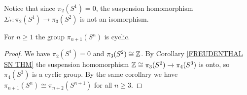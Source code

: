 \begin{note}
Notice that since  $\pi_{2}(S^{1}) = 0$, the suspension homomorphism 
$\Sigma_{\ast}\colon \pi_{2}(S^{1}) \to \pi_{3}(S^{2})$ is not an isomorphism.
\end{note}


\begin{corollary}
For $n\geq 1$ the group $\pi_{n+1}(S^{n})$ is cyclic. 
\end{corollary}

\begin{proof}
We have $\pi_{2}(S^{1}) = 0$ and $\pi_{3}(S^{2})\cong {\mathbb Z}$. 
By Corollary \ref{FREUDENTHAL SN THM} the suspension homomorphism 
${\mathbb Z}\cong \pi_{3}(S^{2}) \to \pi_{4}(S^{3})$ is onto, so $\pi_{4}(S^{3})$ is a cyclic group. 
By the same corollary we have $\pi_{n+1}(S^{n}) \cong \pi_{n+2}(S^{n+1})$ for all 
$n\geq 3$.
\end{proof}







